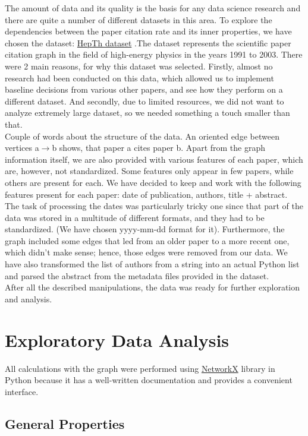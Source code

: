 \documentclass{article}
\newcommand\tab[1][1cm]{\hspace*{#1}}
\begin{document}
\tab	The amount of data and its quality is the basis for any data science research and there are quite a number of different datasets in this area. To explore the dependencies between the paper citation rate and its inner properties, we have chosen the dataset: \href{https://www.kaggle.com/datasets/wolfram77/graphs-snap-cit}{HepTh dataset} .The dataset represents the scientific paper citation graph in the field of high-energy physics in the years 1991 to 2003. There were 2 main reasons, for why this dataset was selected. Firstly, almost no research had been conducted on this data, which allowed us to implement baseline decisions from various other papers, and see how they perform on a different dataset. And secondly, due to limited resources, we did not want to analyze extremely large dataset, so we needed something a touch smaller than that. \\
\tab	 Couple of words about the structure of the data. An oriented edge between vertices a$\rightarrow$b shows, that paper a cites paper b. Apart from the graph information itself, we are also provided with various features of each paper, which are, however, not standardized. Some features only appear in few papers, while others are present for each. We have decided to keep and work with the following features present for each paper: date of publication, authors, title + abstract. \\
\tab	The task of processing the dates was particularly tricky one since that part of the data was stored in a multitude of different formats, and they had to be standardized. (We have chosen yyyy-mm-dd format for it). Furthermore, the graph included some edges that led from an older paper to a more recent one, which didn't make sense; hence, those edges were removed from our data. We have also transformed the list of authors from a string into an actual Python list and parsed the abstract from the metadata files provided in the dataset. \\
\tab	After all the described manipulations, the data was ready for further exploration and analysis. \\

\section{Exploratory Data Analysis}
\tab All calculations with the graph were performed using \href{https://networkx.org/}{NetworkX} library in Python because it has a well-written documentation and provides a convenient interface.
\subsection{General Properties}
\end{document}
